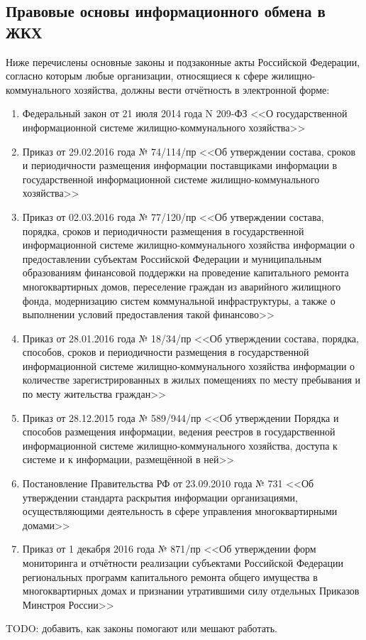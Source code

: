 \subsection{Правовые основы информационного обмена в ЖКХ}

Ниже перечислены основные законы и подзаконные акты Российской Федерации, согласно которым любые организации, относящиеся к сфере жилищно-коммунального хозяйства, должны вести отчётность в электронной форме:

\begin{enumerate}
	\item Федеральный закон от 21 июля 2014 года N 209-ФЗ <<О государственной информационной системе жилищно-коммунального хозяйства>>
	\item Приказ от 29.02.2016 года № 74/114/пр <<Об утверждении состава, сроков и периодичности размещения информации поставщиками информации в государственной информационной системе жилищно-коммунального хозяйства>>
	\item Приказ от 02.03.2016 года № 77/120/пр <<Об утверждении состава, порядка, сроков и периодичности размещения в государственной информационной системе жилищно-коммунального хозяйства информации о предоставлении субъектам Российской Федерации и муниципальным образованиям финансовой поддержки на проведение капитального ремонта многоквартирных домов, переселение граждан из аварийного жилищного фонда, модернизацию систем коммунальной инфраструктуры, а также о выполнении условий предоставления такой финансово>>
	\item Приказ от 28.01.2016 года № 18/34/пр <<Об утверждении состава, порядка, способов, сроков и периодичности размещения в государственной информационной системе жилищно-коммунального хозяйства информации о количестве зарегистрированных в жилых помещениях по месту пребывания и по месту жительства граждан>>
	\item Приказ от 28.12.2015 года № 589/944/пр <<Об утверждении Порядка и способов размещения информации, ведения реестров в государственной информационной системе жилищно-коммунального хозяйства, доступа к системе и к информации, размещённой в ней>>
	\item Постановление Правительства РФ от 23.09.2010 года № 731 <<Об утверждении стандарта раскрытия информации организациями, осуществляющими деятельность в сфере управления многоквартирными домами>>
	\item Приказ от 1 декабря 2016 года № 871/пр <<Об утверждении форм мониторинга и отчётности реализации субъектами Российской Федерации региональных программ капитального ремонта общего имущества в многоквартирных домах и признании утратившими силу отдельных Приказов Минстроя России>>
\end{enumerate}

TODO: добавить, как законы помогают или мешают работать.

\clearpage
\newpage